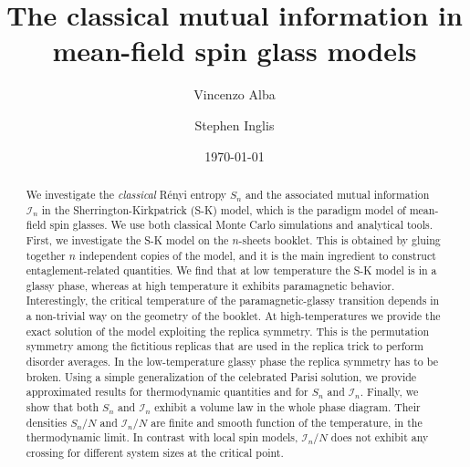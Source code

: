 \documentclass[twocolumn,superscriptaddress,prb,10pt]{revtex4-1}
\begin{document}
\title{The classical mutual information in mean-field spin glass models} 

\author{Vincenzo Alba}
\author{Stephen Inglis}

\date{\today}




\begin{abstract} 

We investigate the \emph{classical} R\'enyi entropy $S_n$ and the associated mutual 
information ${\mathcal I}_n$ in the Sherrington-Kirkpatrick (S-K) model, which is the 
paradigm model of mean-field spin glasses. We use both classical Monte Carlo simulations 
and analytical tools. First, we investigate the S-K model on the $n$-sheets booklet. This 
is obtained by gluing together $n$ independent copies of the model, and it is the 
main ingredient to construct entaglement-related quantities. We find that at low temperature 
the S-K model is in a glassy phase, whereas at high temperature it exhibits paramagnetic 
behavior. Interestingly, the critical temperature of the paramagnetic-glassy transition 
depends in a non-trivial way on the geometry of the booklet. At high-temperatures we provide 
the exact solution of the model exploiting the replica symmetry. This is the permutation 
symmetry among the fictitious replicas that are used in the replica trick to perform disorder 
averages. In the low-temperature glassy phase the replica symmetry has 
to be broken. Using a simple generalization of the celebrated Parisi solution, we provide 
approximated results for thermodynamic quantities and for $S_n$ and ${\mathcal I}_n$. 
Finally, we show that both $S_n$ and ${\mathcal I}_n$ exhibit a volume law in the whole phase 
diagram. Their densities $S_n/N$ and ${\mathcal I}_n/N$ are finite and smooth 
function of the temperature, in the thermodynamic limit. In contrast with local spin models, 
${\mathcal I}_n/N$ does not exhibit any crossing for different system sizes at the 
critical point. 

\end{abstract}


\maketitle
\end{document}
